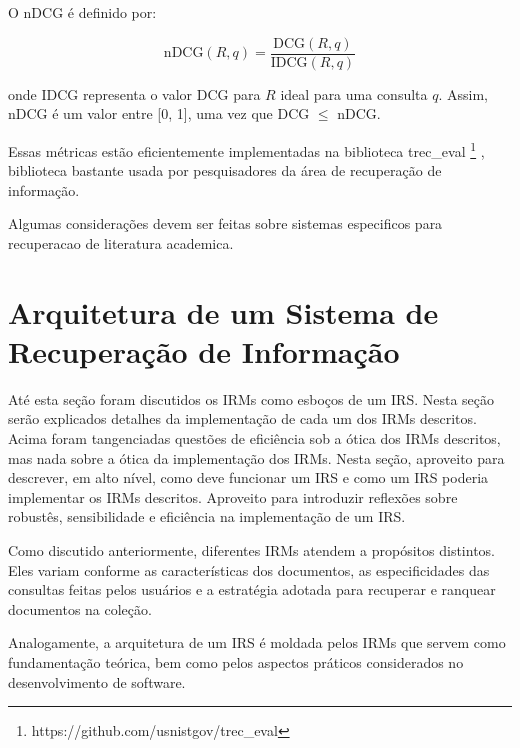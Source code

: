 \documentclass[
	12pt,				%
	openright,			%
	oneside,			%
	a4paper,			%
	english,			%
	french,				%
	spanish,			%
	brazil				%
	]{abntex2}
\begin{document}
O nDCG é definido por:

\begin{equation}
    \text{nDCG}(R,q) = \frac{\text{DCG}(R,q)}{\text{IDCG}(R,q)}
\end{equation}

onde IDCG representa o valor DCG para $R$ ideal para uma consulta $q$.
Assim, nDCG é um valor entre [0, 1], uma vez que DCG $\leq$ nDCG.

Essas métricas estão eficientemente implementadas na biblioteca trec\_eval
\footnote{https://github.com/usnistgov/trec\_eval}
, biblioteca bastante usada por
pesquisadores da área de recuperação de informação.

Algumas considerações devem ser feitas sobre sistemas especificos para recuperacao de literatura academica.


\section{Arquitetura de um Sistema de Recuperação de Informação}
\label{sec:arquitetura-de-um-sistema-de-recuperacao-de-informacao}

Até esta seção foram discutidos os IRMs como esboços de um IRS.
Nesta seção serão explicados detalhes da implementação de cada um dos IRMs descritos.
Acima foram tangenciadas questões de eficiência sob a ótica dos IRMs descritos, mas nada sobre a ótica da implementação dos IRMs.
Nesta seção, aproveito para descrever, em alto nível, como deve funcionar um IRS e como um IRS poderia implementar os IRMs descritos.
Aproveito para introduzir reflexões sobre robustês, sensibilidade e eficiência na implementação de um IRS.

Como discutido anteriormente, diferentes IRMs atendem a propósitos distintos. Eles variam conforme as características dos documentos, as especificidades das consultas feitas pelos usuários e a estratégia adotada para recuperar e ranquear documentos na coleção.

Analogamente, a arquitetura de um IRS é moldada pelos IRMs que servem como fundamentação teórica, bem como pelos aspectos práticos considerados no desenvolvimento de software.

\end{document}
